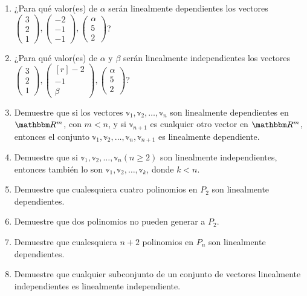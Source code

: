 \begin{enumerate}[start=90]
    \item ¿Para qué valor(es) de $\alpha$ serán linealmente dependientes los vectores $\begin{pmatrix*}3 \\ 2 \\ 1\end{pmatrix*},\begin{pmatrix*}-2 \\ -1 \\ -1\end{pmatrix*},\begin{pmatrix*}\alpha \\ 5 \\ 2\end{pmatrix*}$?
    \item ¿Para qué valor(es) de $\alpha$ y $\beta$ serán linealmente independientes los vectores $\begin{pmatrix*}3 \\ 2 \\ 1\end{pmatrix*},\begin{pmatrix*}[r]-2 \\ -1 \\ \beta\end{pmatrix*},\begin{pmatrix*}\alpha \\ 5 \\ 2\end{pmatrix*}$?
    \item Demuestre que si los vectores $\mathbb{v}_{1}, \mathbb{v}_{2}, \dots, \mathbb{v}_{n}$ son linealmente dependientes en $\RR[m]$, con $m<n$, y si $\mathbb{v}_{n+1}$ es cualquier otro vector en $\RR[m]$, entonces el conjunto $\mathbb{v}_{1}, \mathbb{v}_{2}, \dots, \mathbb{v}_{n}, \mathbb{v}_{n+1}$ es linealmente dependiente.
    \item Demuestre que si $\mathbb{v}_{1}, \mathbb{v}_{2}, \dots, \mathbb{v}_{n}(n \geq 2)$ son linealmente independientes, entonces también lo son $\mathbb{v}_{1}, \mathbb{v}_{2}, \dots, \mathbb{v}_{k}$, donde $k<n$.
    \item Demuestre que cualesquiera cuatro polinomios en $P_{2}$ son linealmente dependientes.
    \item Demuestre que dos polinomios no pueden generar a $P_{2}$.
    \item Demuestre que cualesquiera $n+2$ polinomios en $P_{n}$ son linealmente dependientes.
    \item Demuestre que cualquier subconjunto de un conjunto de vectores linealmente independientes es linealmente independiente.

\end{enumerate}
